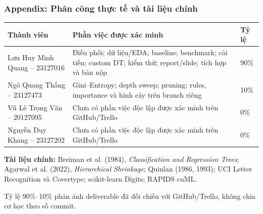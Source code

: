 \documentclass[aspectratio=169,12pt]{beamer}
\newcommand{\memberone}{Lưu Huy Minh Quang -- 23127016}
\newcommand{\membertwo}{Ngô Quang Thắng -- 23127473}
\newcommand{\memberthree}{Vũ Lê Trọng Văn -- 20127095}
\newcommand{\memberfour}{Nguyễn Duy Khang -- 23127202}
\begin{document}
\begin{frame}
  \frametitle{Appendix: Phân công thực tế và tài liệu chính}
  \scriptsize
  \begin{tabularx}{\textwidth}{@{}L{3.2cm}Y L{1.1cm}@{}}
    \toprule
    \textbf{Thành viên} & \textbf{Phần việc được xác minh} & \textbf{Tỷ lệ} \\
    \midrule
    \memberone & Điều phối; dữ liệu/EDA; baseline; benchmark; cải tiến; custom DT; kiểm thử; report/slide; tích hợp và bản nộp & 90\% \\
    \membertwo & Gini--Entropy; depth sweep; pruning; rules, importance và hình cây trên branch riêng & 10\% \\
    \memberthree & Chưa có phần việc độc lập được xác minh trên GitHub/Trello & 0\% \\
    \memberfour & Chưa có phần việc độc lập được xác minh trên GitHub/Trello & 0\% \\
    \bottomrule
  \end{tabularx}
  \par\vspace{0.32cm}
  \textbf{Tài liệu chính:} Breiman et al. (1984), \textit{Classification and Regression Trees}; Agarwal et al. (2022), \textit{Hierarchical Shrinkage}; Quinlan (1986, 1993); UCI Letter Recognition và Covertype; scikit-learn Digits; RAPIDS cuML.
  \vspace{0.28cm}
  \begin{tcolorbox}[focusbox,width=0.92\textwidth,top=1mm,bottom=1mm]
    \centering
    Tỷ lệ 90\%--10\% phản ánh deliverable đã đối chiếu với GitHub/Trello, không chia cơ học theo số commit.
  \end{tcolorbox}
\end{frame}
\end{document}
